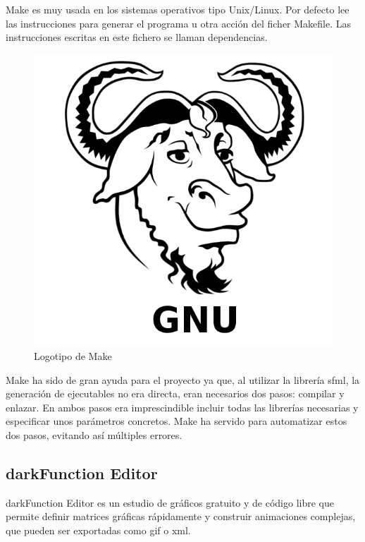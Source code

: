 		Make es muy usada en los sistemas operativos tipo Unix/Linux. Por defecto lee las instrucciones para generar el programa u otra acción del ficher Makefile. Las instrucciones escritas en este fichero se llaman dependencias.

		\begin{figure}[!htp]
			 \centering
			 \includegraphics{fig/make}
			 \caption{Logotipo de Make}
			 \label{fig:make}
		\end{figure}

		Make ha sido de gran ayuda para el proyecto ya que, al utilizar la librería \acrshort{sfml}, la generación de ejecutables no era directa, eran necesarios dos pasos: compilar y enlazar. En ambos pasos era imprescindible incluir todas las librerías necesarias y especificar unos parámetros concretos. Make ha servido para automatizar estos dos pasos, evitando así múltiples errores.

	\subsection{darkFunction Editor}

		darkFunction Editor es un estudio de gráficos gratuito y de código libre que permite definir matrices gráficas rápidamente y construir animaciones complejas, que pueden ser exportadas como \acrshort{gif} o \acrshort{xml}.

